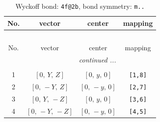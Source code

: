 \documentclass[fleqn,8pt]{jsarticle}
\begin{document}
\renewcommand{\arraystretch}{1.2}
\begin{longtable}{cccc}
\caption{Wyckoff bond: {\tt 4f@2b}, bond symmetry: {\tt m..}}
 \\
 \hline \hline
No. & vector & center & mapping \\ \hline \endfirsthead

\multicolumn{3}{l}{\tablename\ \thetable{}} \\
 \hline \hline
No. & vector & center & mapping \\ \hline \endhead

 \hline \hline
\multicolumn{3}{r}{\footnotesize\it continued ...} \\ \endfoot

 \hline \hline
\multicolumn{3}{r}{} \\ \endlastfoot

1 & $\left[ 0,\, Y,\, Z \right]$ & $\left[ 0,\, y,\, 0 \right]$ & {\tt [1,8]} \\ \hline
2 & $\left[ 0,\, - Y,\, Z \right]$ & $\left[ 0,\, - y,\, 0 \right]$ & {\tt [2,7]} \\ \hline
3 & $\left[ 0,\, Y,\, - Z \right]$ & $\left[ 0,\, y,\, 0 \right]$ & {\tt [3,6]} \\ \hline
4 & $\left[ 0,\, - Y,\, - Z \right]$ & $\left[ 0,\, - y,\, 0 \right]$ & {\tt [4,5]} \\
\end{longtable}
\renewcommand{\arraystretch}{1.2}
\end{document}
